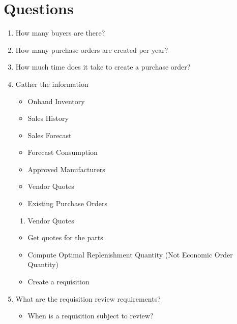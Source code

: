 \documentclass[letterpaper,10pt,english]{sphinxmanual}
\begin{document}
\chapter{Questions}
\label{\detokenize{Questions:questions}}\label{\detokenize{Questions::doc}}\begin{enumerate}
%
\item {} 
How many buyers are there?

\item {} 
How many purchase orders are created per year?

\item {} 
How much time does it take to create a purchase order?

\item {} 
Gather the information
\begin{itemize}
\item {} 
Onhand Inventory

\item {} 
Sales History

\item {} 
Sales Forecast

\item {} 
Forecast Consumption

\item {} 
Approved Manufacturers

\item {} 
Vendor Quotes

\item {} 
Existing Purchase Orders

\end{itemize}
\begin{enumerate}
%
\item {} 
Vendor Quotes

\end{enumerate}
\begin{itemize}
\item {} 
Get quotes for the parts

\item {} 
Compute Optimal Replenishment Quantity (Not Economic Order
Quantity)

\item {} 
Create a requisition

\end{itemize}

\item {} 
What are the requisition review requirements?
\begin{itemize}
\item {} 
When is a requisition subject to review?


\end{itemize}
\end{enumerate}
\end{document}
